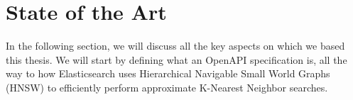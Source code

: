 \section{State of the Art}\label{sec:state-of-the-art}
In the following section, we will discuss all the key aspects on which we based this thesis.
We will start by defining what an OpenAPI specification is, all the way to how Elasticsearch uses Hierarchical Navigable Small World Graphs (HNSW) to efficiently perform approximate K-Nearest Neighbor searches.







